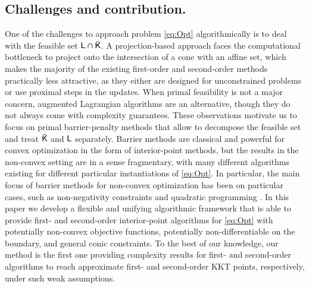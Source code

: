 \subsection{Challenges and contribution.}
One of the challenges to approach problem \eqref{eq:Opt} algorithmically is to deal with the feasible set $\mathsf{L}\cap\bar{\mathsf{K}}$. A projection-based approach faces the computational bottleneck to project onto the intersection of a cone with an affine set, which makes the majority of the existing first-order \cite{GhaLan16,nesterov2020primal-dual,guminov2021combination,carmon2017convex,agarwal2017finding,cartis2019optimality} and second-order \cite{NesPol06,conn2000trust,cartis2012complexity,CurRobSam17,CarGouToi12,birgin2017regularization,CarGouToi18,cartis2019optimality,doikov2021minimizing} methods practically less attractive, as they either are designed for unconstrained problems or use proximal steps in the updates. 
When primal feasibility is not a major concern, augmented Lagrangian algorithms \cite{birgin2017complexity,grapiglia2020complexity,Andreani:2019uf} are an alternative, though they do not always come with complexity guarantees.
%
%
These observations motivate us to focus on primal barrier-penalty methods that allow to decompose the feasible set and treat $\bar{\mathsf{K}}$ and $\mathsf{L}$ separately.
Barrier methods are classical and powerful for convex optimization in the form of interior-point methods, but the results in the non-convex setting are in a sense fragmentary, with many different algorithms existing for different particular instantiations of \eqref{eq:Opt}. In particular, the main focus of barrier methods for non-convex optimization has been on particular cases, such as non-negativity constraints \cite{Ye92,TseBomSch11,HBA-linear,BiaCheYe15,HaeLiuYe18,NeiWr20} and quadratic programming \cite{Ye92,FayLu06,LuYua07}. 
In this paper we develop a flexible and unifying algorithmic framework that is able to provide first- and second-order interior-point algorithms for \eqref{eq:Opt} with potentially non-convex objective functions, potentially non-differentiable on the boundary, and general conic constraints. To the best of our knowledge, our method is the first one providing complexity results for first- and second-order algorithms to reach approximate first- and second-order KKT points, respectively, under such weak assumptions. 
%
